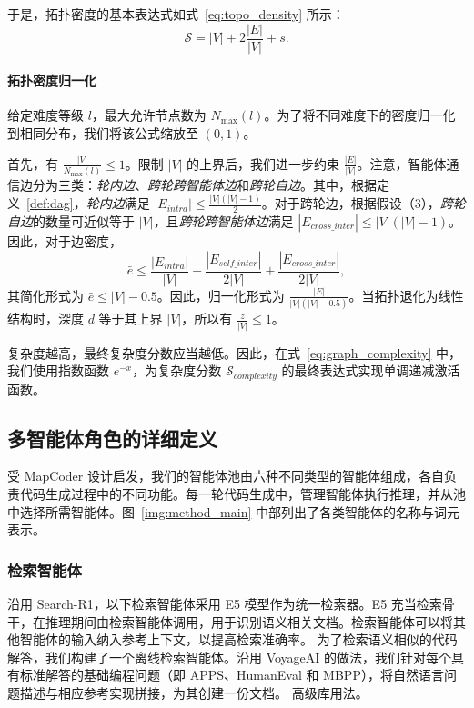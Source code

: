 \documentclass{article}
\theoremstyle{definition}
\begin{document}
于是，拓扑密度的基本表达式如式~\ref{eq:topo_density} 所示：
\begin{equation}\label{eq:topo_density}
\mathcal{S} = |V| + 2\frac{|E|}{|V|} + s.
\end{equation}
\paragraph{拓扑密度归一化}
给定难度等级 $l$，最大允许节点数为 $N_{\max}(l)$。为了将不同难度下的密度归一化到相同分布，我们将该公式缩放至 $(0, 1)$。

首先，有 $\frac{|V|}{N_{\max}(l)} \leq 1$。限制 $|V|$ 的上界后，我们进一步约束 $\frac{|E|}{|V|}$。注意，智能体通信边分为三类：\emph{轮内边}、\emph{跨轮跨智能体边}和\emph{跨轮自边}。其中，根据定义~\ref{def:dag}，\emph{轮内边}满足 $|E_{intra}| \leq \frac{|V|(|V|-1)}{2}$。对于跨轮边，根据假设（3），\emph{跨轮自边}的数量可近似等于 $|V|$，且\emph{跨轮跨智能体边}满足 $|E_{cross\_inter}|\leq |V|(|V|-1)$。因此，对于边密度，
\begin{equation}\label{eq:edge_density1}
\bar{e} \leq \frac{|E_{intra}|}{|V|} + \frac{|E_{self\_inter}|}{2|V|}+\frac{|E_{cross\_inter}|}{2|V|},
\end{equation}
其简化形式为 $\bar{e} \leq |V|-0.5$。因此，归一化形式为 $\frac{|E|}{|V|(|V|-0.5)}$。当拓扑退化为线性结构时，深度 $d$ 等于其上界 $|V|$，所以有 $\frac{z}{|V|} \leq 1$。

复杂度越高，最终复杂度分数应当越低。因此，在式~\ref{eq:graph_complexity} 中，我们使用指数函数 $e^{-x}$，为复杂度分数 $\mathcal{S}_{complexity}$ 的最终表达式实现单调递减激活函数。
\subsection{多智能体角色的详细定义}
受 MapCoder 设计启发，我们的智能体池由六种不同类型的智能体组成，各自负责代码生成过程中的不同功能。每一轮代码生成中，管理智能体执行推理，并从池中选择所需智能体。图~\ref{img:method_main} 中部列出了各类智能体的名称与词元表示。
\subsubsection{检索智能体}
沿用 Search-R1\citep{jin2025search}，以下检索智能体采用 E5 模型作为统一检索器。E5 充当检索骨干，在推理期间由检索智能体调用，用于识别语义相关文档。检索智能体可以将其他智能体的输入纳入参考上下文，以提高检索准确率。
为了检索语义相似的代码解答，我们构建了一个离线检索智能体。沿用 VoyageAI 的做法，我们针对每个具有标准解答的基础编程问题（即 APPS、HumanEval 和 MBPP），将自然语言问题描述与相应参考实现拼接，为其创建一份文档。
高级库用法。
\end{document}
